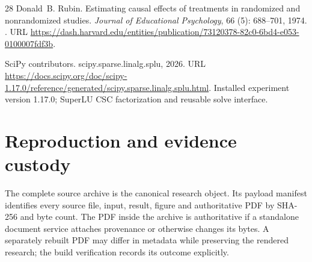 \documentclass[11pt,a4paper]{article}
\begin{document}
\begin{thebibliography}{28}
Donald~B. Rubin.
\newblock Estimating causal effects of treatments in randomized and
  nonrandomized studies.
\newblock \emph{Journal of Educational Psychology}, 66 (5):
  688--701, 1974.
\newblock {}.
\newblock URL
  \url{https://dash.harvard.edu/entities/publication/73120378-82c0-6bd4-e053-0100007fdf3b}.

{SciPy contributors}.
\newblock scipy.sparse.linalg.splu, 2026.
\newblock URL
  \url{https://docs.scipy.org/doc/scipy-1.17.0/reference/generated/scipy.sparse.linalg.splu.html}.
\newblock Installed experiment version 1.17.0; SuperLU CSC factorization and
  reusable solve interface.

\end{thebibliography}

\clearpage
\appendix
\section{Reproduction and evidence custody}\label{app:reproduction}
The complete source archive is the canonical research object. Its payload manifest identifies every source file, input, result, figure and authoritative PDF by SHA-256 and byte count. The PDF inside the archive is authoritative if a standalone document service attaches provenance or otherwise changes its bytes. A separately rebuilt PDF may differ in metadata while preserving the rendered research; the build verification records its outcome explicitly.
\end{document}
